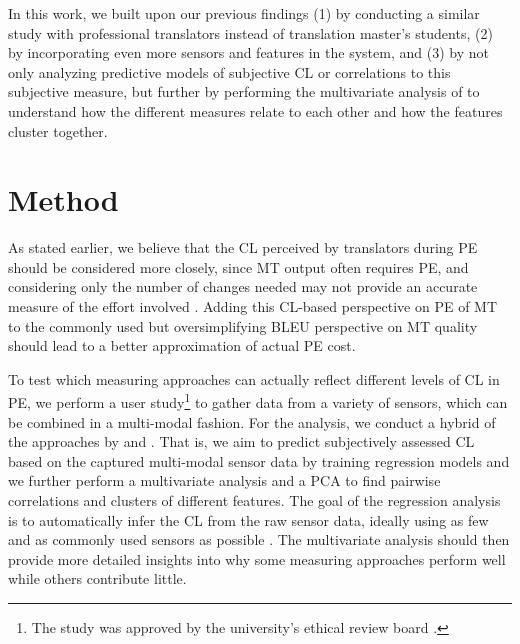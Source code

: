 \documentclass[output=paper]{langsci/langscibook}
\begin{document}
In this work, we built upon our previous findings (1) by conducting a similar study with professional translators instead of translation master's students, (2) by incorporating even more sensors and features in the system, and (3) by not only analyzing predictive models of subjective CL or correlations to this subjective measure, but further by performing the multivariate analysis of \citet{vieira2016measures} to understand how the different measures relate to each other and how the features cluster together.


\section{Method}
As stated earlier, we believe that the CL perceived by translators during PE should be considered more closely, since MT output often requires PE, and considering only the number of changes needed may not provide an accurate measure of the effort involved \citep{koponen2016machine}. %
Adding this CL-based perspective on PE of MT to the commonly used but oversimplifying BLEU  \citep{BLEU:2002} perspective on MT quality should lead to a better approximation of actual PE cost.
%

To test which measuring approaches can actually reflect different levels of CL in PE, we perform a user study\footnote{The study was approved by the university's ethical review board%
.} to gather data from a variety of sensors, which can be combined in a multi-modal fashion.
For the analysis, we conduct a hybrid of the approaches by \citet{herbig2019mt} and \citet{vieira2016measures}. That is, we aim to predict subjectively assessed CL based on the captured multi-modal sensor data by training regression models and we further perform a multivariate analysis and a PCA to find pairwise correlations and clusters of different features.
The goal of the regression analysis is to automatically infer the CL from the raw sensor data, ideally using as few and as commonly used sensors as possible%
. The multivariate analysis should then provide more detailed insights into why some measuring approaches perform well while others contribute little.
\end{document}
